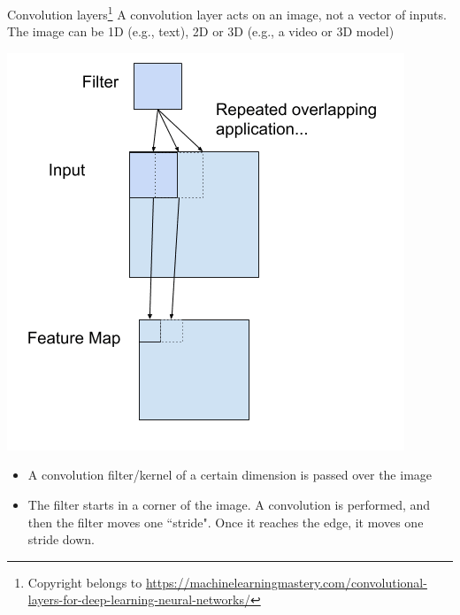 \documentclass{beamer}
\begin{document}
\begin{frame}{Convolution layers\footnote{Copyright belongs to \url{https://machinelearningmastery.com/convolutional-layers-for-deep-learning-neural-networks/}}}
A convolution layer acts on an image, not a vector of inputs. The image can be 1D (e.g., text), 2D or 3D (e.g., a video or 3D model)
\begin{minipage}{0.49\linewidth}
\includegraphics[width=\textwidth]{Images/cfilter.png}
\end{minipage}
\begin{minipage}{0.49\linewidth}
\begin{itemize}
\item A convolution filter/kernel of a certain dimension is passed over the image
\item The filter starts in a corner of the image. A convolution is performed, and then the filter moves one ``stride". Once it reaches the edge, it moves one stride down.
\end{itemize}
\end{minipage}
\end{frame}
\end{document}
